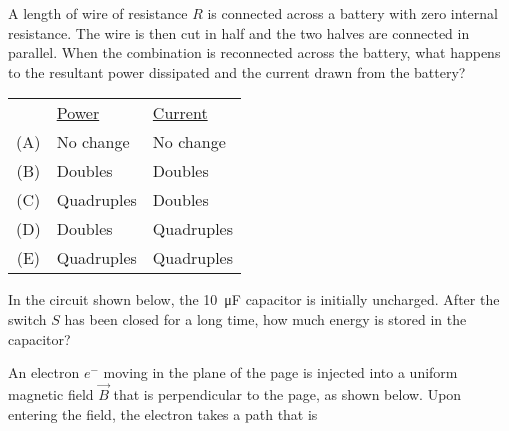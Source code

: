 \documentclass[12pt]{../oss-classkick-exam}
\begin{document}
\begin{questions}
  \uplevel{ \rule{\linewidth}{.5pt}}
    
  \question A length of wire of resistance $R$ is connected across a battery
  with zero internal resistance. The wire is then cut in half and the two
  halves are connected in parallel. When the combination is reconnected across
  the battery, what happens to the resultant power dissipated and the current
  drawn from the battery?

  \begin{tabular}{cll}
    & \underline{Power} & \underline{Current}\\
    (A) & No change  & No change \\
    (B) & Doubles    & Doubles   \\
    (C) & Quadruples & Doubles   \\
    (D) & Doubles    & Quadruples\\
    (E) & Quadruples & Quadruples
  \end{tabular}
  
  \uplevel{\rule{\linewidth}{.5pt}}
  
  \question In the circuit shown below, the \SI{10}{\micro\farad} capacitor is
  initially uncharged. After the switch $S$ has been closed for a long time,
  how much energy is stored in the capacitor?

  \begin{minipage}{.4\linewidth}
  \end{minipage}
  \begin{minipage}{.54\linewidth}
  \end{minipage}
  \newpage
  
  \question An electron $e^-$ moving in the plane of the page is injected into a
  uniform magnetic field $\vec B$ that is perpendicular to the page, as shown
  below. Upon entering the field, the electron takes a path that is


\end{questions}
\end{document}
